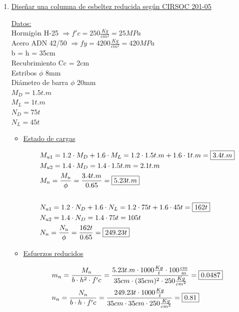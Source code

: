 \begin{enumerate}
\item \underline{Diseñar una columna de esbeltez reducida según CIRSOC 201-05}

\underline{Datos:}\\
Hormigón H-25 $\Rightarrow f'c = 250 \frac{Kg}{cm^2} = 25 MPa$\\
Acero ADN 42/50 $\Rightarrow fy = 4200 \frac{Kg}{cm^2} = 420 MPa$\\
b = h = 35cm\\
Recubrimiento Cc = 2cm\\
Estribos $\phi$ 8mm\\
Diámetro de barra $\phi$ 20mm\\
$M_D = 1.5t.m$\\
$M_L = 1t.m$\\
$N_D = 75t$\\
$N_L = 45t$\\

\begin{itemize}
\item \underline{Estado de cargas}

\begin{align*}
& M_{u1} = 1.2 \cdot M_D + 1.6 \cdot M_L = 1.2 \cdot 1.5 t.m + 1.6 \cdot 1 t.m = \framebox{$3.4t.m$}\\
& M_{u2} = 1.4 \cdot M_D = 1.4 \cdot 1.5 t.m = 2.1t.m\\
& M_n = \frac{M_u}{\phi} = \frac{3.4 t.m}{0.65} = \framebox{$5.23t.m$}\\
& \\
& N_{u1} = 1.2 \cdot N_D + 1.6 \cdot N_L = 1.2 \cdot 75 t + 1.6 \cdot 45 t = \framebox{$162t$}\\
& N_{u2} = 1.4 \cdot N_D = 1.4 \cdot 75 t = 105t\\
& N_n = \frac{N_u}{\phi} = \frac{162 t}{0.65} = \framebox{$249.23t$}
\end{align*}

\item \underline{Esfuerzos reducidos}

\begin{align*}
& m_{n} = \frac{M_n}{b \cdot h^2 \cdot f'c} = \frac{5.23t.m \cdot 1000\frac{Kg}{t} \cdot 100\frac{cm}{m}}{35cm \cdot (35cm)^2 \cdot 250 \frac{Kg}{cm^2}} = \framebox{0.0487}\\
& n_{n} = \frac{N_n}{b \cdot h \cdot f'c} = \frac{249.23t \cdot 1000\frac{Kg}{t}}{35cm \cdot 35cm\cdot 250 \frac{Kg}{cm^2}} = \framebox{0.81}
\end{align*}



\end{itemize}
\end{enumerate}
